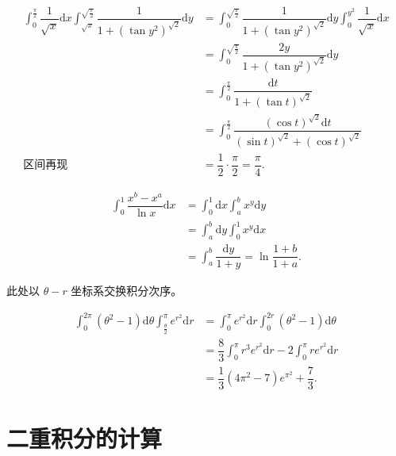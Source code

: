 \begin{equation*}
    \begin{aligned}
        \int_0^\frac{\pi}{2}\dfrac{1}{\sqrt{x}}\mathrm{d}x\int_{\sqrt{x}}^{\sqrt{\frac{\pi}{2}}}
        \dfrac{1}{1+(\tan y^2)^{\sqrt 2}}\mathrm{d}y 
        &= \int_0^{\sqrt{\frac{\pi}{2}}}\dfrac{1}{1+(\tan y^2)^{\sqrt 2}}
        \mathrm{d}y\int_0^{y^2}\dfrac{1}{\sqrt x}\mathrm{d}x
        \\&= \int_0^{\sqrt{\frac{\pi}{2}}}\dfrac{2y}{1+(\tan y^2)^{\sqrt 2}}\mathrm{d}y
        \\&= \int_0^{\frac{\pi}{2}}\dfrac{\mathrm{d}t}{1+(\tan t)^{\sqrt 2}}
        \\&= \int_0^{\frac{\pi}{2}}\dfrac{(\cos t)^{\sqrt 2}\mathrm{d}t}{(\sin t)^{\sqrt 2}+(\cos t)^{\sqrt 2}} 
        \\\textrm{区间再现}&=\dfrac{1}{2}\cdot\dfrac{\pi}{2} = \dfrac{\pi}{4}.
    \end{aligned}
\end{equation*}


\begin{equation*}
    \begin{aligned}
        \int_0^1\dfrac{x^b-x^a}{\ln x}\mathrm{d}x &= 
        \int_0^1 \mathrm{d}x\int_a^b x^y\mathrm{d}y \\ 
        &= \int_a^b \mathrm{d}y \int_0^1 x^y\mathrm{d}x
        \\&= \int_a^b \dfrac{\mathrm{d}y}{1+y} = \ln\dfrac{1+b}{1+a}.
    \end{aligned}
\end{equation*}


此处以 $ \theta - r $ 坐标系交换积分次序。

\begin{equation*}
    \begin{aligned}
        \int_0^{2\pi}(\theta^2-1)\mathrm{d}\theta\int_{\frac{\theta}{2}}^\pi e^{r^2}\mathrm{d}r &=
        \int_0^\pi e^{r^2}\mathrm{d}r\int_0^{2r}(\theta^2-1)\mathrm{d}\theta \\ 
        &= \dfrac{8}{3}\int_0^\pi r^3e^{r^2}\mathrm{d}r - 2\int_0^\pi re^{r^2}\mathrm{d}r
        \\ &= \dfrac{1}{3}(4\pi^2-7)e^{\pi^2}+\dfrac{7}{3}.
    \end{aligned}
\end{equation*}

\section{二重积分的计算}

